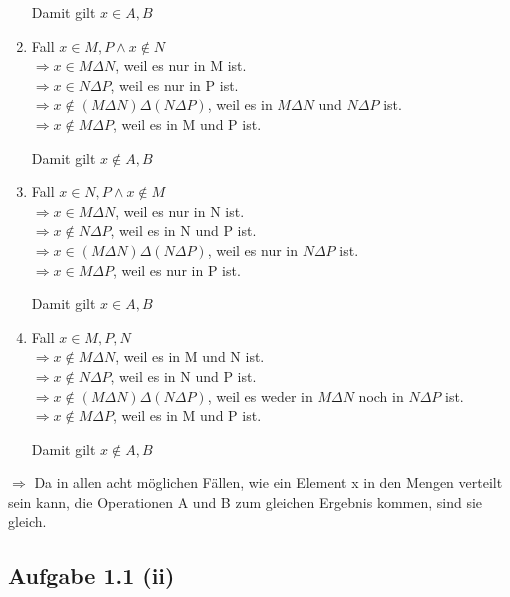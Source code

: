 \documentclass{article}
\begin{document}
\begin{enumerate}
            Damit gilt \(x \in A, B \) 

            \item Fall \(x \in M, P \land x \notin N \) \\
            \(\Rightarrow x \in M \Delta N \), weil es nur in M ist. \\
            \(\Rightarrow x \in N \Delta P \), weil es nur in P ist. \\
            \(\Rightarrow x \notin ( M \Delta N )\Delta(N \Delta P ) \), weil es in \(M \Delta N\) und \(N \Delta P\) ist. \\
            \(\Rightarrow x \notin M \Delta P \), weil es in M und P ist.

            Damit gilt \(x \notin A, B \) 
            
            \item Fall \(x \in N, P \land x \notin M \) \\
            \(\Rightarrow x \in M \Delta N \), weil es nur in N ist. \\
            \(\Rightarrow x \notin N \Delta P \), weil es in N und P ist. \\
            \(\Rightarrow x \in ( M \Delta N )\Delta(N \Delta P ) \), weil es nur in \(N \Delta P\) ist. \\
            \(\Rightarrow x \in M \Delta P \), weil es nur in P ist.

            Damit gilt \(x \in A, B \)

            \item Fall \(x \in M, P, N \) \\
            \(\Rightarrow x \notin M \Delta N \), weil es in M und N ist. \\
            \(\Rightarrow x \notin N \Delta P \), weil es in N und P ist. \\
            \(\Rightarrow x \notin ( M \Delta N )\Delta(N \Delta P ) \), weil es weder in \(M \Delta N\) noch in \(N \Delta P\) ist. \\
            \(\Rightarrow x \notin M \Delta P \), weil es in M und P ist.

            Damit gilt \(x \notin A, B \) 
        \end{enumerate}

        \( \Rightarrow \) Da in allen acht möglichen Fällen, wie ein Element x
        in den Mengen verteilt sein kann, die Operationen A und B zum gleichen Ergebnis kommen, sind sie gleich.


        \subsection*{Aufgabe 1.1 (ii)}
            \newtheorem{thm}{Theorem}
            \newtheorem{lemma}[thm]{Lemma}
\end{document}
